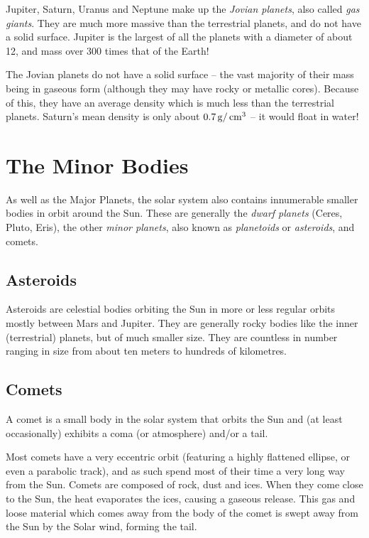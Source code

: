 Jupiter, Saturn, Uranus and Neptune make up the \emph{Jovian planets},
also called \emph{gas giants}. They are much more massive than the
terrestrial planets, and do not have a solid surface. Jupiter is the
largest of all the planets with a diameter of about 12, and mass over
300 times that of the Earth!

The Jovian planets do not have a solid surface -- the vast majority of
their mass being in gaseous form (although they may have rocky or
metallic cores). Because of this, they have an average density which is
much less than the terrestrial planets. Saturn's mean density is only
about $0.7 \,\mathrm{g}/\,\mathrm{cm}^3$ -- it would float in water!

\section{The Minor Bodies}%

As well as the Major Planets, the solar system also contains
innumerable smaller bodies in orbit around the Sun. These are
generally the \emph{dwarf planets} (Ceres, Pluto, Eris), the other
\emph{minor planets}, also known as \emph{planetoids} or
\emph{asteroids}, and comets.

\subsection{Asteroids}
\label{sec:Phenomena:Asteroids}

Asteroids are celestial bodies orbiting the Sun in more or less regular
orbits mostly between Mars and Jupiter. They are generally rocky bodies
like the inner (terrestrial) planets, but of much smaller size. They
are countless in number ranging in size from about ten meters to
hundreds of kilometres.

\subsection{Comets}
\label{sec:Phenomena:Comets}

A comet is a small body in the solar system that orbits the Sun and (at
least occasionally) exhibits a coma (or atmosphere) and/or a tail.

Most comets have a very eccentric orbit (featuring a highly flattened
ellipse, or even a parabolic track), and as such spend most of their
time a very long way from the Sun. Comets are composed of rock, dust
and ices. When they come close to the Sun, the heat evaporates the
ices, causing a gaseous release. This gas and loose material which
comes away from the body of the comet is swept away from the Sun by
the Solar wind, forming the tail.

